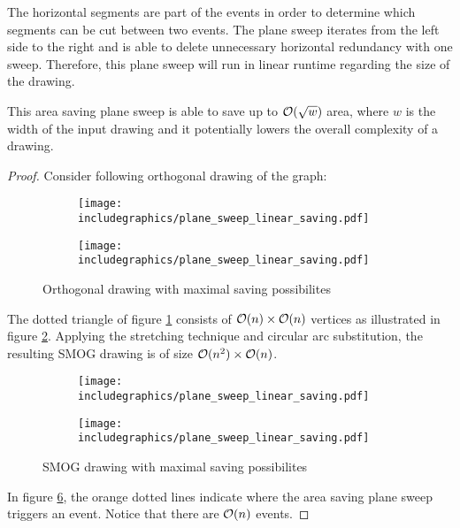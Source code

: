 The horizontal segments are part of the events in order to determine which segments can be cut between two events. The plane sweep iterates from the left side to the right and is able to delete unnecessary horizontal redundancy with one sweep. Therefore, this plane sweep will run in linear runtime regarding the size of the drawing.
\begin{lemma}
	This area saving plane sweep is able to save up to $\mathcal{O}(\sqrt{w})$ area, where $w$ is the width of the input drawing and it potentially lowers the overall complexity of a drawing.
\end{lemma}
\begin{proof}
	Consider following orthogonal drawing of the graph:
	\begin{figure}[H]
		\centering
		\begin{subfigure}{0.45\linewidth}
			\centering
			\texttt{[image: includegraphics/plane\_sweep\_linear\_saving.pdf]}
			\caption{}\label{im:ortho_max_saving1}
		\end{subfigure}	
		\begin{subfigure}{0.4\linewidth}
			\centering
			\texttt{[image: includegraphics/plane\_sweep\_linear\_saving.pdf]}
			\caption{}\label{im:ortho_max_saving2}
		\end{subfigure}
	\caption{Orthogonal drawing with maximal saving possibilites}\label{im:ortho_max_saving}
	\end{figure}
The dotted triangle of figure \ref{im:ortho_max_saving1} consists of $\mathcal{O}(n)\times\mathcal{O}(n)$ vertices as illustrated in figure \ref{im:ortho_max_saving2}. Applying the stretching technique and circular arc substitution, the resulting SMOG drawing is of size $\mathcal{O}(n^2)\times\mathcal{O}(n)$.
	\begin{figure}[H]
	\centering
	\begin{subfigure}{0.45\linewidth}
		\centering
		\texttt{[image: includegraphics/plane\_sweep\_linear\_saving.pdf]}
		\caption{}\label{im:ortho_max_saving3}
	\end{subfigure}	
	\begin{subfigure}{0.4\linewidth}
		\centering
		\texttt{[image: includegraphics/plane\_sweep\_linear\_saving.pdf]}
		\caption{}\label{im:ortho_max_saving4}
	\end{subfigure}
	\caption{SMOG drawing with maximal saving possibilites}
\end{figure}
In figure \ref{im:ortho_max_saving4}, the orange dotted lines indicate where the area saving plane sweep triggers an event. Notice that there are $\mathcal{O}(n)$ events.

\end{proof}
